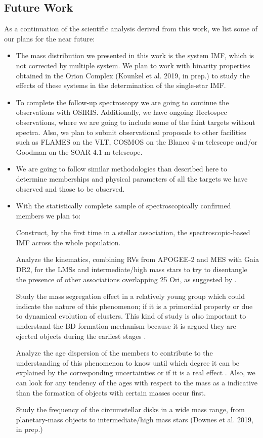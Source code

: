 \documentclass[12pt]{article}
\begin{document}
\subsection{Future Work}
As a continuation of the scientific analysis derived from this work, we list some of our plans for the near future:

\begin{itemize}
	\item The mass distribution we presented in this work is the system IMF, which is not corrected by multiple system. We plan to work with binarity properties obtained in the Orion Complex (Kounkel et al. 2019, in prep.) to study the effects of these systems in the determination of the single-star IMF.
	\item To complete the follow-up spectroscopy we are going to continue the observations with OSIRIS. Additionally, we have ongoing Hectospec observations, where we are going to include some of the faint targets without spectra. Also, we plan to submit observational proposals to other facilities such as FLAMES on the VLT, COSMOS on the Blanco 4-m telescope and/or Goodman on the SOAR 4.1-m telescope. 
	\item We are going to follow similar methodologies than described here to determine memberships and physical parameters of all the targets we have observed and those to be observed.
	\item With the statistically complete sample of spectroscopically confirmed members we plan to: \par
		Construct, by the first time in a stellar association, the spectroscopic-based IMF across the whole population. \par
		Analyze the kinematics, combining RVs from APOGEE-2 and MES with Gaia DR2, for the LMSs and intermediate/high mass stars to try to disentangle the presence of other associations overlapping 25 Ori, as suggested by \citet{Kounkel2018,Briceno2018}. \par
		Study the mass segregation effect in a relatively young group which could indicate the nature of this phenomenon; if it is a primordial property \citep{Bonnell-Davies1998,Bonnell2001} or due to dynamical evolution \citep{Kroupa2001a,Kroupa2001b} of clusters. This kind of study is also important to understand the BD formation mechanism because it is argued they are ejected objects during the earliest stages \citep{Reipurth-Clarke2001}. \par
		Analyze the age dispersion of the members to contribute to the understanding of this phenomenon to know until which degree it can be explained by the corresponding uncertainties or if it is a real effect \citep{Palla-Stahler1999,Palla-Stahler2000}. Also, we can look for any tendency of the ages with respect to the mass as a indicative than the formation of objects with certain masses occur first. \par
		Study the frequency of the circumstellar disks in a wide mass range, from planetary-mass objects to intermediate/high mass stars (Downes et al. 2019, in prep.)
\end{itemize}
\end{document}
